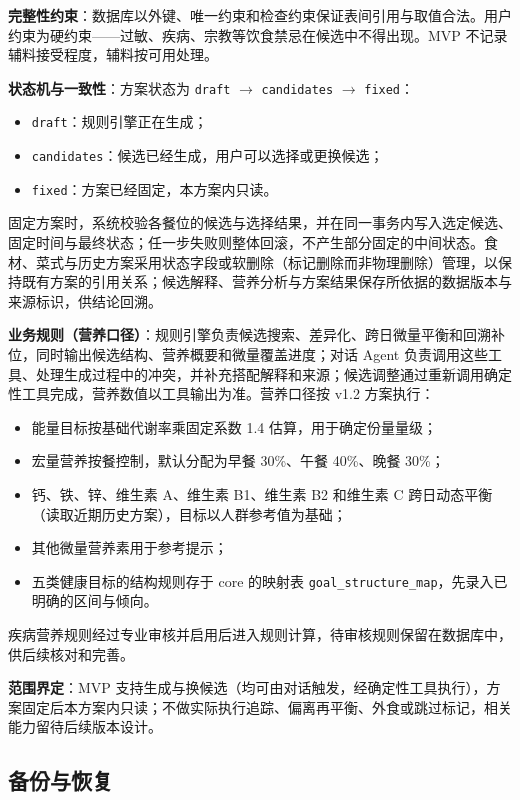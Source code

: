 \documentclass[12pt,a4paper]{ctexart}
\begin{document}
\textbf{完整性约束}：数据库以外键、唯一约束和检查约束保证表间引用与取值合法。用户约束为硬约束——过敏、疾病、宗教等饮食禁忌在候选中不得出现。MVP 不记录辅料接受程度，辅料按可用处理。

\textbf{状态机与一致性}：方案状态为 \texttt{draft} $\rightarrow$ \texttt{candidates} $\rightarrow$ \texttt{fixed}：

\begin{itemize}
\item \texttt{draft}：规则引擎正在生成；
\item \texttt{candidates}：候选已经生成，用户可以选择或更换候选；
\item \texttt{fixed}：方案已经固定，本方案内只读。
\end{itemize}

固定方案时，系统校验各餐位的候选与选择结果，并在同一事务内写入选定候选、固定时间与最终状态；任一步失败则整体回滚，不产生部分固定的中间状态。食材、菜式与历史方案采用状态字段或软删除（标记删除而非物理删除）管理，以保持既有方案的引用关系；候选解释、营养分析与方案结果保存所依据的数据版本与来源标识，供结论回溯。

\textbf{业务规则（营养口径）}：规则引擎负责候选搜索、差异化、跨日微量平衡和回溯补位，同时输出候选结构、营养概要和微量覆盖进度；对话 Agent 负责调用这些工具、处理生成过程中的冲突，并补充搭配解释和来源；候选调整通过重新调用确定性工具完成，营养数值以工具输出为准。营养口径按 v1.2 方案执行：

\begin{itemize}
\item 能量目标按基础代谢率乘固定系数 1.4 估算，用于确定份量量级；
\item 宏量营养按餐控制，默认分配为早餐 30\%、午餐 40\%、晚餐 30\%；
\item 钙、铁、锌、维生素 A、维生素 B1、维生素 B2 和维生素 C 跨日动态平衡（读取近期历史方案），目标以人群参考值为基础；
\item 其他微量营养素用于参考提示；
\item 五类健康目标的结构规则存于 core 的映射表 \texttt{goal\_structure\_map}，先录入已明确的区间与倾向。
\end{itemize}

疾病营养规则经过专业审核并启用后进入规则计算，待审核规则保留在数据库中，供后续核对和完善。

\textbf{范围界定}：MVP 支持生成与换候选（均可由对话触发，经确定性工具执行），方案固定后本方案内只读；不做实际执行追踪、偏离再平衡、外食或跳过标记，相关能力留待后续版本设计。

\subsection{备份与恢复}
\end{document}
